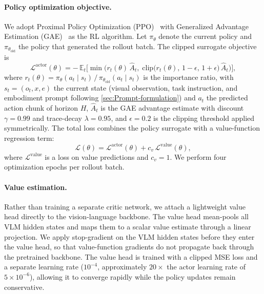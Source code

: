\documentclass{llmxive}
\begin{document}
\paragraph{Policy optimization objective.}
We adopt Proximal Policy Optimization (PPO)~\citep{ppo} with Generalized Advantage Estimation (GAE)~\citep{schulman2015high} as the RL algorithm.
Let $\pi_\theta$ denote the current policy and $\pi_{\theta_\text{old}}$ the policy that generated the rollout batch.
The clipped surrogate objective is
\begin{equation}
\label{eq:ppo}
\mathcal{L}^\text{actor}(\theta) = -\,\mathbb{E}_{t}\Big[\min\!\Big(
    r_t(\theta)\,\hat{A}_t,\;
    \text{clip}\!\big(r_t(\theta),\,1{-}\epsilon,\,1{+}\epsilon\big)\,\hat{A}_t
\Big)\Big],
\end{equation}
where $r_t(\theta) = \pi_\theta(a_t \mid s_t)\,/\,\pi_{\theta_\text{old}}(a_t \mid s_t)$ is the importance ratio, with $s_t = (o_t, x, e)$ the current state (visual observation, task instruction, and embodiment prompt following \cref{sec:Prompt-formulation}) and $a_t$ the predicted action chunk of horizon $H$, $\hat{A}_t$ is the GAE advantage estimate with discount $\gamma{=}0.99$ and trace-decay $\lambda{=}0.95$, and $\epsilon{=}0.2$ is the clipping threshold applied symmetrically.
The total loss combines the policy surrogate with a value-function regression term:
\begin{equation}
\label{eq:ppo-total}
\mathcal{L}(\theta) = \mathcal{L}^\text{actor}(\theta) + c_v\,\mathcal{L}^\text{value}(\theta),
\end{equation}
where $\mathcal{L}^\text{value}$ is a loss on value predictions and $c_v{=}1$.
We perform four optimization epochs per rollout batch.



\paragraph{Value estimation.}
Rather than training a separate critic network, we attach a lightweight value head directly to the vision-language backbone.
The value head mean-pools all VLM hidden states and maps them to a scalar value estimate through a linear projection.
We apply stop-gradient on the VLM hidden states before they enter the value head, so that value-function gradients do not propagate back through the pretrained backbone.
The value head is trained with a clipped MSE loss and a separate learning rate ($10^{-4}$, approximately $20\times$ the actor learning rate of $5{\times}10^{-6}$), allowing it to converge rapidly while the policy updates remain conservative.
\end{document}
